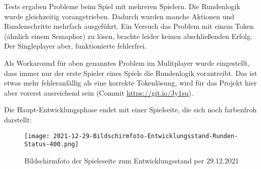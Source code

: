 Tests ergaben Probleme beim Spiel mit mehreren Spielern. Die Rundenlogik wurde gleichzeitig vorangetrieben. Dadurch wurden manche Aktionen und Rundenschritte mehrfach ausgeführt. Ein Versuch das Problem mit einem Token (ähnlich einem Semaphor) zu lösen, brachte leider keinen abschließenden Erfolg. Der Singleplayer aber, funktionierte fehlerfrei. 

Als Workaround für oben genanntes Problem im Mulitplayer wurde eingestellt, dass immer nur der erste Spieler eines Spiels die Rundenlogik vorantreibt. Das ist etwas mehr fehleranfällig als eine korrekte Tokenlösung, wird für das Projekt hier aber vorerst ausreichend sein (Commit \url{https://git.io/Jy1su}).

Die Haupt-Entwicklungsphase endet mit einer Spielseite, die sich noch farbenfroh darstellt: 

\begin{figure}[H]
    \centering
    \caption{Bildschirmfoto der Spieleseite zum Entwicklungsstand per 29.12.2021}
    \label{fig:2021-12-29-Bildschirmfoto-Entwicklungsstand-Runden-Status-400.png}
    \texttt{[image: 2021-12-29-Bildschirmfoto-Entwicklungsstand-Runden-Status-400.png]}
\end{figure}
    
